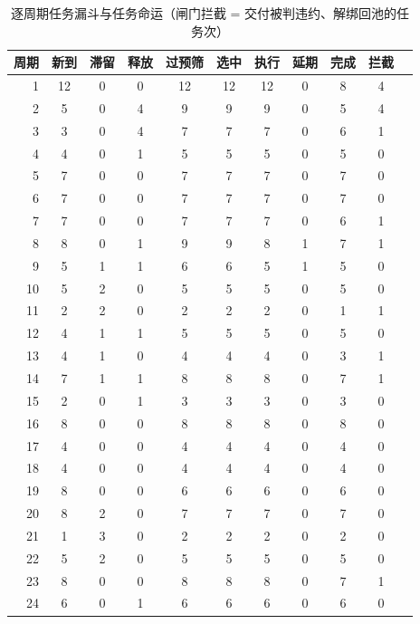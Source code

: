 \documentclass[a4paper,11pt]{article}
\begin{document}
\begin{table}[htbp]\centering
\caption{逐周期任务漏斗与任务命运（闸门拦截 = 交付被判违约、解绑回池的任务次）}
\label{tab:exp01-funnel}
\begin{tabular}{rcccccccccc}
\toprule
周期 & 新到 & 滞留 & 释放 & 过预筛 & 选中 & 执行 & 延期 & 完成 & 拦截 \\
\midrule
1 & 12 & 0 & 0 & 12 & 12 & 12 & 0 & 8 & 4 \\
2 & 5 & 0 & 4 & 9 & 9 & 9 & 0 & 5 & 4 \\
3 & 3 & 0 & 4 & 7 & 7 & 7 & 0 & 6 & 1 \\
4 & 4 & 0 & 1 & 5 & 5 & 5 & 0 & 5 & 0 \\
5 & 7 & 0 & 0 & 7 & 7 & 7 & 0 & 7 & 0 \\
6 & 7 & 0 & 0 & 7 & 7 & 7 & 0 & 7 & 0 \\
7 & 7 & 0 & 0 & 7 & 7 & 7 & 0 & 6 & 1 \\
8 & 8 & 0 & 1 & 9 & 9 & 8 & 1 & 7 & 1 \\
9 & 5 & 1 & 1 & 6 & 6 & 5 & 1 & 5 & 0 \\
10 & 5 & 2 & 0 & 5 & 5 & 5 & 0 & 5 & 0 \\
11 & 2 & 2 & 0 & 2 & 2 & 2 & 0 & 1 & 1 \\
12 & 4 & 1 & 1 & 5 & 5 & 5 & 0 & 5 & 0 \\
13 & 4 & 1 & 0 & 4 & 4 & 4 & 0 & 3 & 1 \\
14 & 7 & 1 & 1 & 8 & 8 & 8 & 0 & 7 & 1 \\
15 & 2 & 0 & 1 & 3 & 3 & 3 & 0 & 3 & 0 \\
16 & 8 & 0 & 0 & 8 & 8 & 8 & 0 & 8 & 0 \\
17 & 4 & 0 & 0 & 4 & 4 & 4 & 0 & 4 & 0 \\
18 & 4 & 0 & 0 & 4 & 4 & 4 & 0 & 4 & 0 \\
19 & 8 & 0 & 0 & 6 & 6 & 6 & 0 & 6 & 0 \\
20 & 8 & 2 & 0 & 7 & 7 & 7 & 0 & 7 & 0 \\
21 & 1 & 3 & 0 & 2 & 2 & 2 & 0 & 2 & 0 \\
22 & 5 & 2 & 0 & 5 & 5 & 5 & 0 & 5 & 0 \\
23 & 8 & 0 & 0 & 8 & 8 & 8 & 0 & 7 & 1 \\
24 & 6 & 0 & 1 & 6 & 6 & 6 & 0 & 6 & 0 \\
\bottomrule
\end{tabular}
\end{table}
\end{document}
